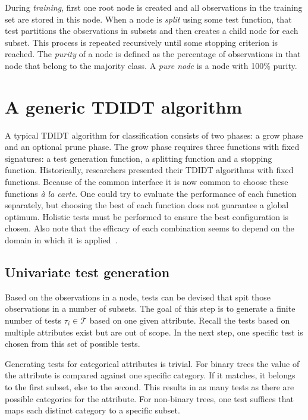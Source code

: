 During \emph{training}, first one root node is created and all observations in the training set are stored in this node. When a node is \emph{split} using some test function, that test partitions the observations in subsets and then creates a child node for each subset. This process is repeated recursively until some stopping criterion is reached. The \emph{purity} of a node is defined as the percentage of observations in that node that belong to the majority class. A \emph{pure node} is a node with 100\% purity.

\section{A generic TDIDT algorithm}
A typical TDIDT algorithm for classification consists of two phases: a grow phase and an optional prune phase. The grow phase requires three functions with fixed signatures: a test generation function, a splitting function and a stopping function. Historically, researchers presented their TDIDT algorithms with fixed functions. Because of the common interface it is now common to choose these functions \emph{\`{a} la carte}. One could try to evaluate the performance of each function separately, but choosing the best of each function does not guarantee a global optimum. Holistic tests must be performed to ensure the best configuration is chosen. Also note that the efficacy of each combination seems to depend on the domain in which it is applied~\cite{mingers1989empirical}.

\subsection{Univariate test generation}
Based on the observations in a node, tests can be devised that spit those observations in a number of subsets. The goal of this step is to generate a finite number of tests $\tau_i \in \mathcal{T}$ based on one given attribute. Recall the tests based on multiple attributes exist but are out of scope. In the next step, one specific test is chosen from this set of possible tests.

Generating tests for categorical attributes is trivial. For binary trees the value of the attribute is compared against one specific category. If it matches, it belongs to the first subset, else to the second. This results in as many tests as there are possible categories for the attribute. For non-binary trees, one test suffices that maps each distinct category to a specific subset.

